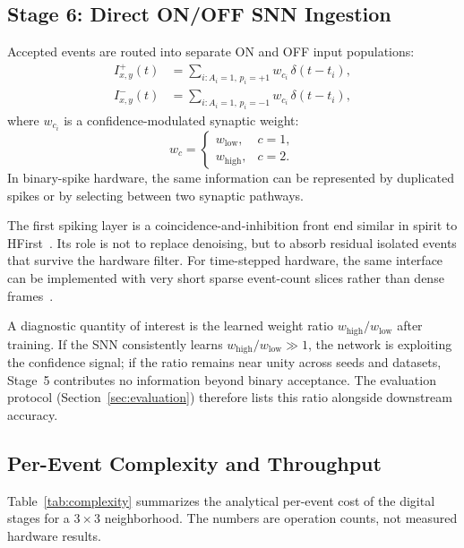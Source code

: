 \documentclass[a4paper,fleqn]{cas-dc}
\begin{document}
\subsection{Stage 6: Direct ON/OFF SNN Ingestion}
\label{sec:snn}

Accepted events are routed into separate ON and OFF input populations:
\begin{equation}
\begin{split}
I^{+}_{x,y}(t) &= \sum_{i:A_i=1,\,p_i=+1} w_{c_i}\,\delta(t-t_i), \\
I^{-}_{x,y}(t) &= \sum_{i:A_i=1,\,p_i=-1} w_{c_i}\,\delta(t-t_i),
\end{split}
\label{eq:input}
\end{equation}
where $w_{c_i}$ is a confidence-modulated synaptic weight:
\begin{equation}
w_c =
\begin{cases}
w_{\text{low}}, & c=1,\\
w_{\text{high}}, & c=2.
\end{cases}
\label{eq:weights}
\end{equation}
In binary-spike hardware, the same information can be represented by duplicated spikes or by selecting between two synaptic pathways.

The first spiking layer is a coincidence-and-inhibition front end similar in spirit to HFirst~\citep{orchard2015hfirst}. Its role is not to replace denoising, but to absorb residual isolated events that survive the hardware filter. For time-stepped hardware, the same interface can be implemented with very short sparse event-count slices rather than dense frames~\citep{bonazzi2024retina}.

A diagnostic quantity of interest is the learned weight ratio $w_{\text{high}}/w_{\text{low}}$ after training. If the SNN consistently learns $w_{\text{high}}/w_{\text{low}}\gg 1$, the network is exploiting the confidence signal; if the ratio remains near unity across seeds and datasets, Stage~5 contributes no information beyond binary acceptance. The evaluation protocol (Section~\ref{sec:evaluation}) therefore lists this ratio alongside downstream accuracy.

\subsection{Per-Event Complexity and Throughput}
\label{sec:complexity}

Table~\ref{tab:complexity} summarizes the analytical per-event cost of the digital stages for a $3\times3$ neighborhood. The numbers are operation counts, not measured hardware results.
\end{document}
